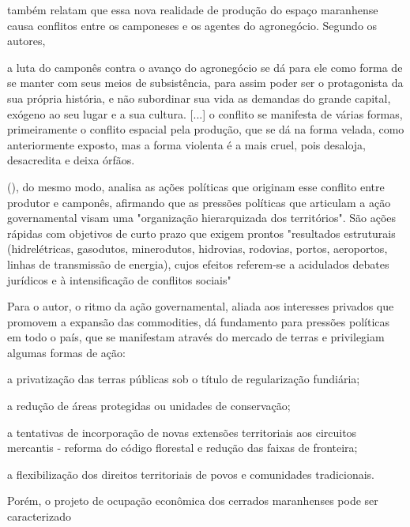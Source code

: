  também relatam que essa nova realidade de produção do espaço maranhense causa conflitos entre os camponeses e os agentes do agronegócio. Segundo os autores, 

\begin{citacao}
a luta do camponês contra o avanço do agronegócio se dá para ele como forma de se manter com seus meios de subsistência, para assim poder ser o protagonista da sua própria história, e não subordinar sua vida as demandas do grande capital, exógeno ao seu lugar e a sua cultura. [...] o conflito se manifesta de várias formas, primeiramente o conflito espacial pela produção, que se dá na forma velada, como anteriormente exposto, mas a forma violenta é a mais cruel, pois desaloja, desacredita e deixa órfãos. \cite[p. 10]{rodrigues_alencar}
\end{citacao}

 (\citeyear{almeida}), do mesmo modo, analisa as ações políticas que originam esse conflito entre produtor e camponês, afirmando que as pressões políticas que articulam a ação governamental visam uma "organização hierarquizada dos territórios". São ações rápidas com objetivos de curto prazo que exigem prontos "resultados estruturais (hidrelétricas, gasodutos, minerodutos, hidrovias, rodovias, portos, aeroportos, linhas de transmissão de energia), cujos efeitos referem-se a acidulados debates jurídicos e à intensificação de conflitos sociais" \cite{almeida}

Para o autor, o ritmo da ação governamental, aliada aos interesses privados que promovem a expansão das commodities, dá fundamento para pressões políticas em todo o país, que se manifestam através do mercado de terras e privilegiam algumas formas de ação:

\begin{alineas}
   \item a privatização das terras públicas sob o título de regularização fundiária;
   \item a redução de áreas protegidas ou unidades de conservação;
   \item a tentativas de incorporação de novas extensões territoriais aos circuitos mercantis - reforma do código florestal e redução das faixas de fronteira;
   \item a flexibilização dos direitos territoriais de povos e comunidades tradicionais.
\end{alineas}

Porém, o projeto de ocupação econômica dos cerrados maranhenses pode ser caracterizado


